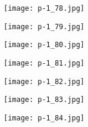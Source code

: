 \clearpage


\begin{figure}
    \begin{center}
        \texttt{[image: p-1\_78.jpg]}
        \caption{}
    \end{center}
\end{figure}

\clearpage


\begin{figure}
    \begin{center}
        \texttt{[image: p-1\_79.jpg]}
        \caption{}
    \end{center}
\end{figure}

\clearpage


\begin{figure}
    \begin{center}
        \texttt{[image: p-1\_80.jpg]}
        \caption{}
    \end{center}
\end{figure}

\clearpage


\begin{figure}
    \begin{center}
        \texttt{[image: p-1\_81.jpg]}
        \caption{}
    \end{center}
\end{figure}

\clearpage


\begin{figure}
    \begin{center}
        \texttt{[image: p-1\_82.jpg]}
        \caption{}
    \end{center}
\end{figure}

\clearpage


\begin{figure}
    \begin{center}
        \texttt{[image: p-1\_83.jpg]}
        \caption{}
    \end{center}
\end{figure}

\clearpage


\begin{figure}
    \begin{center}
        \texttt{[image: p-1\_84.jpg]}
        \caption{}
    \end{center}
\end{figure}

